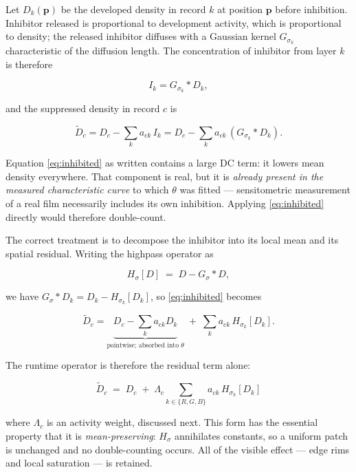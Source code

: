 Let $D_k(\mathbf{p})$ be the developed density in record $k$ at position
$\mathbf{p}$ before inhibition. Inhibitor released is proportional to
development activity, which is proportional to density; the released inhibitor
diffuses with a Gaussian kernel $G_{\sigma_k}$ characteristic of the diffusion
length. The concentration of inhibitor from layer $k$ is therefore

\begin{equation}
I_k = G_{\sigma_k} * D_k,
\label{eq:inhibitor}
\end{equation}

and the suppressed density in record $c$ is

\begin{equation}
\tilde{D}_c = D_c - \sum_{k} a_{ck}\, I_k
= D_c - \sum_{k} a_{ck}\, \left(G_{\sigma_k} * D_k\right).
\label{eq:inhibited}
\end{equation}

Equation \eqref{eq:inhibited} as written contains a large DC term: it lowers
mean density everywhere. That component is real, but it is \emph{already
present in the measured characteristic curve} to which $\theta$ was fitted ---
sensitometric measurement of a real film necessarily includes its own
inhibition. Applying \eqref{eq:inhibited} directly would therefore double-count.

The correct treatment is to decompose the inhibitor into its local mean and its
spatial residual. Writing the highpass operator as

\begin{equation}
H_{\sigma}[D] \;=\; D - G_{\sigma} * D,
\end{equation}

we have $G_\sigma * D_k = D_k - H_{\sigma_k}[D_k]$, so \eqref{eq:inhibited}
becomes

\begin{equation}
\tilde{D}_c = \underbrace{D_c - \sum_k a_{ck} D_k}_{\text{pointwise; absorbed into } \theta}
\;+\; \sum_k a_{ck}\, H_{\sigma_k}[D_k].
\end{equation}

The runtime operator is therefore the residual term alone:

\begin{equation}
\boxed{\;\tilde{D}_c \;=\; D_c \;+\; \Lambda_c \sum_{k \in \{R,G,B\}} a_{ck}\, H_{\sigma_k}\!\left[D_k\right]\;}
\label{eq:interlayer}
\end{equation}

where $\Lambda_c$ is an activity weight, discussed next. This form has the
essential property that it is \emph{mean-preserving}: $H_\sigma$ annihilates
constants, so a uniform patch is unchanged and no double-counting occurs. All of
the visible effect --- edge rims and local saturation --- is retained.

